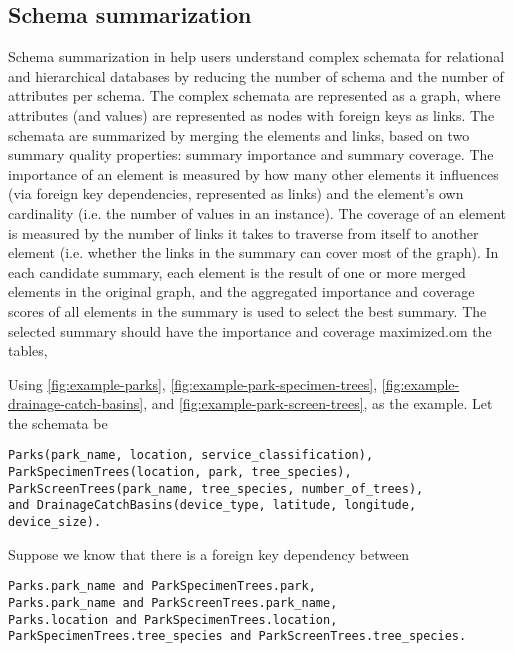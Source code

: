 \subsection{Schema summarization}
\label{ssec:SchemaSummarization}

Schema summarization in \cite{Yu2006Schema} help users understand complex schemata for relational and hierarchical databases by reducing the number of schema and the number of attributes per schema. The complex schemata are represented as a graph, where attributes (and values) are represented as nodes with foreign keys as links. The schemata are summarized by merging the elements and links, based on two summary quality properties: summary importance and summary coverage. The importance of an element is measured by how many other elements it influences (via foreign key dependencies, represented as links) and the element's own cardinality (i.e. the number of values in an instance). The coverage of an element is measured by the number of links it takes to traverse from itself to another element (i.e. whether the links in the summary can cover most of the graph). In each candidate summary, each element is the result of one or more merged elements in the original graph, and the aggregated importance and coverage scores of all elements in the summary is used to select the best summary. The selected summary should have the importance and coverage maximized.om the tables,

Using \autoref{fig:example-parks}, \autoref{fig:example-park-specimen-trees}, \autoref{fig:example-drainage-catch-basins}, and \autoref{fig:example-park-screen-trees}, as the example. Let the schemata be
\begin{lstlisting}
Parks(park_name, location, service_classification),
ParkSpecimenTrees(location, park, tree_species),
ParkScreenTrees(park_name, tree_species, number_of_trees), 
and DrainageCatchBasins(device_type, latitude, longitude, device_size).
\end{lstlisting}

Suppose we know that there is a foreign key dependency between
\begin{lstlisting}
Parks.park_name and ParkSpecimenTrees.park,
Parks.park_name and ParkScreenTrees.park_name,
Parks.location and ParkSpecimenTrees.location,
ParkSpecimenTrees.tree_species and ParkScreenTrees.tree_species.
\end{lstlisting}


